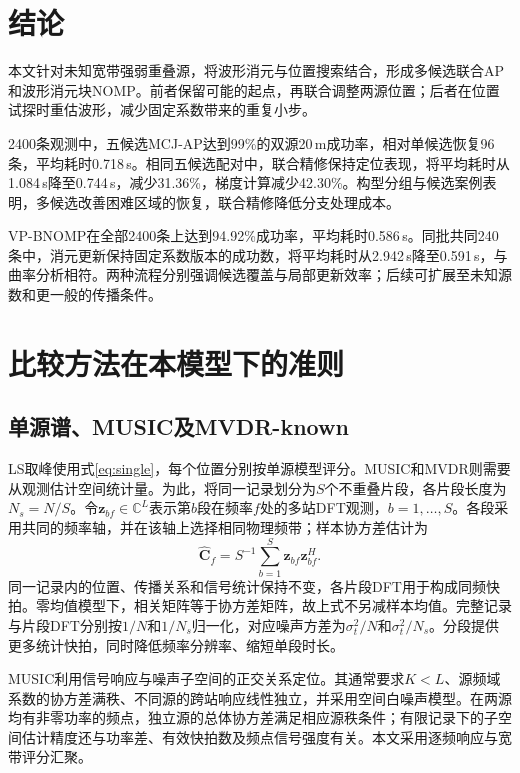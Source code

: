 \documentclass[a4paper,fleqn]{cas-sc}
\numberwithin{equation}{section}
\numberwithin{figure}{section}
\numberwithin{table}{section}
\newcommand{\C}{\mathbb C}
\begin{document}

\FloatBarrier

\section{结论}\label{sec:conclusion}
本文针对未知宽带强弱重叠源，将波形消元与位置搜索结合，形成多候选联合AP和波形消元块NOMP。前者保留可能的起点，再联合调整两源位置；后者在位置试探时重估波形，减少固定系数带来的重复小步。

2400条观测中，五候选MCJ-AP达到99\%的双源20\,m成功率，相对单候选恢复96条，平均耗时0.718\,s。相同五候选配对中，联合精修保持定位表现，将平均耗时从1.084\,s降至0.744\,s，减少31.36\%，梯度计算减少42.30\%。构型分组与候选案例表明，多候选改善困难区域的恢复，联合精修降低分支处理成本。

VP-BNOMP在全部2400条上达到94.92\%成功率，平均耗时0.586\,s。同批共同240条中，消元更新保持固定系数版本的成功数，将平均耗时从2.942\,s降至0.591\,s，与曲率分析相符。两种流程分别强调候选覆盖与局部更新效率；后续可扩展至未知源数和更一般的传播条件。


\FloatBarrier
\appendix

\section{比较方法在本模型下的准则}\label{app:baselines}
\subsection{单源谱、MUSIC及MVDR-known}
LS取峰使用式\eqref{eq:single}，每个位置分别按单源模型评分。MUSIC和MVDR则需要从观测估计空间统计量。为此，将同一记录划分为$S$个不重叠片段，各片段长度为$N_s=N/S$。令$\bm z_{bf}\in\C^L$表示第$b$段在频率$f$处的多站DFT观测，$b=1,\ldots,S$。各段采用共同的频率轴，并在该轴上选择相同物理频带；样本协方差估计为
\begin{equation}
 \widehat{\bm C}_f=S^{-1}\sum_{b=1}^S\bm z_{bf}\bm z_{bf}^H .
\end{equation}
同一记录内的位置、传播关系和信号统计保持不变，各片段DFT用于构成同频快拍。零均值模型下，相关矩阵等于协方差矩阵，故上式不另减样本均值。完整记录与片段DFT分别按$1/N$和$1/N_s$归一化，对应噪声方差为$\sigma_t^2/N$和$\sigma_t^2/N_s$。分段提供更多统计快拍，同时降低频率分辨率、缩短单段时长。

MUSIC利用信号响应与噪声子空间的正交关系定位\cite{WeissAmar2005}。其通常要求$K<L$、源频域系数的协方差满秩、不同源的跨站响应线性独立，并采用空间白噪声模型。在两源均有非零功率的频点，独立源的总体协方差满足相应源秩条件；有限记录下的子空间估计精度还与功率差、有效快拍数及频点信号强度有关。本文采用逐频响应与宽带评分汇聚。
\end{document}
